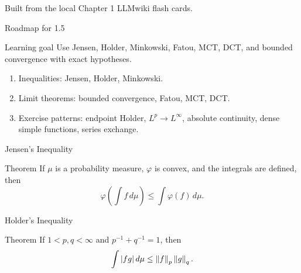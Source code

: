 \begin{frame}
  \titlepage
  \vspace{-5mm}
  \begin{center}
    \small Built from the local Chapter 1 LLMwiki flash cards.
  \end{center}
\end{frame}

\begin{frame}{Roadmap for 1.5}
  \begin{block}{Learning goal}
    Use Jensen, Holder, Minkowski, Fatou, MCT, DCT, and bounded convergence with exact hypotheses.
  \end{block}
  \begin{enumerate}
    \item Inequalities: Jensen, Holder, Minkowski.
    \item Limit theorems: bounded convergence, Fatou, MCT, DCT.
    \item Exercise patterns: endpoint Holder, $L^p\to L^\infty$, absolute continuity, dense simple functions, series exchange.
  \end{enumerate}
\end{frame}

\begin{frame}{Jensen's Inequality}
  \begin{block}{Theorem}
    If $\mu$ is a probability measure, $\varphi$ is convex, and the integrals are defined, then
    \[
      \varphi\left(\int f\,d\mu\right)\le \int \varphi(f)\,d\mu.
    \]
  \end{block}
\end{frame}

\begin{frame}{Holder's Inequality}
  \begin{block}{Theorem}
    If $1<p,q<\infty$ and $p^{-1}+q^{-1}=1$, then
    \[
      \int |fg|\,d\mu\le \left\lVert f\right\rVert_p\left\lVert g\right\rVert_q.
    \]
  \end{block}
\end{frame}

